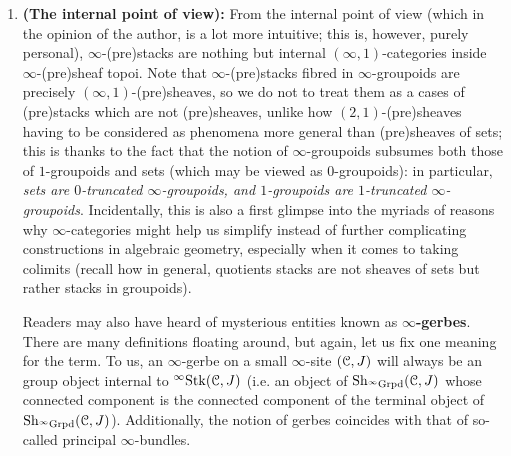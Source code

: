 \begin{convention}
\begin{enumerate}
                        \item \textbf{(The internal point of view):} From the internal point of view (which in the opinion of the author, is a lot more intuitive; this is, however, purely personal), $\infty$-(pre)stacks are nothing but internal $(\infty, 1)$-categories inside $\infty$-(pre)sheaf topoi. Note that $\infty$-(pre)stacks fibred in $\infty$-groupoids are precisely $(\infty, 1)$-(pre)sheaves, so we do not to treat them as a cases of (pre)stacks which are not (pre)sheaves, unlike how $(2, 1)$-(pre)sheaves having to be considered as phenomena more general than (pre)sheaves of sets; this is thanks to the fact that the notion of $\infty$-groupoids subsumes both those of $1$-groupoids and sets (which may be viewed as $0$-groupoids): in particular, \textit{sets are $0$-truncated $\infty$-groupoids, and $1$-groupoids are $1$-truncated $\infty$-groupoids}. Incidentally, this is also a first glimpse into the myriads of reasons why $\infty$-categories might help us simplify instead of further complicating constructions in algebraic geometry, especially when it comes to taking colimits (recall how in general, quotients stacks are not sheaves of sets but rather stacks in groupoids).
                    
                        Readers may also have heard of mysterious entities known as \textbf{$\infty$-gerbes}. There are many definitions floating around, but again, let us fix one meaning for the term. To us, an $\infty$-gerbe on a small $\infty$-site $(\mathcal{C}, J)$ will always be an group object internal to ${}^{\infty}\mathrm{Stk}(\mathcal{C}, J)$ (i.e. an object of $\mathrm{Sh}_{{}^{\infty}\mathrm{Grpd}}(\mathcal{C}, J)$ whose connected component is the connected component of the terminal object of $\mathrm{Sh}_{{}^{\infty}\mathrm{Grpd}}(\mathcal{C}, J)$). Additionally, the notion of gerbes coincides with that of so-called principal $\infty$-bundles.
                    \end{enumerate}
                \end{convention}
                
